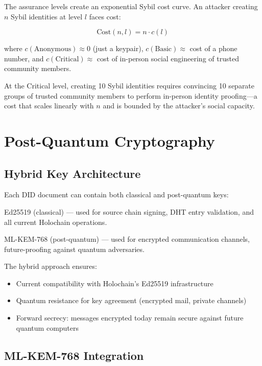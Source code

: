 \documentclass[11pt,twocolumn]{article}
\begin{document}
The assurance levels create an exponential Sybil cost curve. An attacker
creating $n$ Sybil identities at level $l$ faces cost:

\begin{equation}
  \text{Cost}(n, l) = n \cdot c(l)
\end{equation}

where $c(\text{Anonymous}) \approx 0$ (just a keypair), $c(\text{Basic}) \approx$
cost of a phone number, and $c(\text{Critical}) \approx$ cost of in-person
social engineering of trusted community members.

At the Critical level, creating 10 Sybil identities requires convincing 10
separate groups of trusted community members to perform in-person identity
proofing---a cost that scales linearly with $n$ and is bounded by the
attacker's social capacity.

\section{Post-Quantum Cryptography}

\subsection{Hybrid Key Architecture}

Each DID document can contain both classical and post-quantum keys:

\begin{description}[nosep]
  \item[Authentication] Ed25519 (classical) --- used for source chain signing,
    DHT entry validation, and all current Holochain operations.
  \item[Key Agreement] ML-KEM-768 (post-quantum) --- used for encrypted
    communication channels, future-proofing against quantum adversaries.
\end{description}

The hybrid approach ensures:
\begin{itemize}[nosep]
  \item Current compatibility with Holochain's Ed25519 infrastructure
  \item Quantum resistance for key agreement (encrypted mail, private channels)
  \item Forward secrecy: messages encrypted today remain secure against future
    quantum computers
\end{itemize}

\subsection{ML-KEM-768 Integration}
\end{document}
